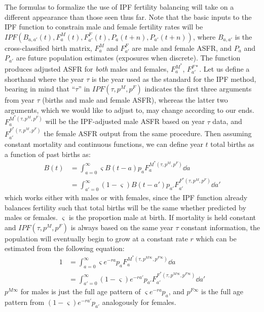The formulas to formalize the use of IPF fertility balancing will take on a
different appearance than those seen thus far. Note that the basic inputs to the
IPF function to constrain male and female fertility rates will be
$IPF(B_{a,a'}(t), F_a^M(t), F_{a'}^F(t),P_a(t+n),P_{a'}(t+n))$, where $B_{a,a'}$
is the cross-classified birth matrix, $F_a^M$ and $F_{a'}^F$ are male and female ASFR,
and $P_a$ and $P_{a'}$ are future population estimates (exposures when
discrete). The function produces adjusted ASFR for \textit{both} males and females,
$F_a^{M^\ast}$, $F_{a'}^{F\ast}$. Let us define a shorthand where the year
$\tau$ is the year used as the standard for the IPF method, bearing in mind that
``$\tau$'' in $IPF(\tau, p^M, p^F)$ indicates the first three arguments from
year $\tau$ (births and male and female ASFR), whereas the latter two arguments,
which we would like to adjust to, may change according to our ends. $F_a^{M^\ast(\tau,p^M, p^F)}$
will be the IPF-adjusted male ASFR based on year $\tau$ data, and
$F_{a'}^{F^\ast(\tau,p^M, p^F)}$ the female ASFR output from the same procedure.
Then assuming constant mortality and continuous functions, we can define year
$t$ total births as a function of past births as:
\begin{align}
B(t) &= \int_{a=0}^\infty \varsigma B(t-a)p_aF_a^{M^\ast(\tau,p^M, p^F)}\dd a
\\ &= \int_{a'=0}^\infty (1-\varsigma) B(t-a')p_{a'}F_{a'}^{F^\ast(\tau,p^M,
p^F)}\dd a'
\end{align}
which works either with males or with females, since the IPF function already
balances fertility such that total births will be the same whether predicted by
males or females. $\varsigma$ is the proportion male at birth. If mortality is
held constant and $IPF(\tau,p^M, p^F)$ is always based on the same year $\tau$ 
constant information, the population will eventually begin
to grow at a constant rate $r$ which can be estimated from the following
equation:
\begin{align}
\label{eq:IPFtricky}
1 &= \int_{a=0}^\infty \varsigma e^{-ra}p_aF_a^{M^\ast(\tau,p^{M\infty},
p^{F\infty})}\dd a \\ 
&= \int_{a'=0}^\infty (1-\varsigma) e^{-ra'}p_{a'}F_{a'}^{F^\ast(\tau,p^{M\infty},
p^{F\infty})}\dd a'
\end{align}
$p^{M\infty}$ for males is just the full age pattern of
$\varsigma e^{-ra}p_a$, and $p^{F\infty}$ is the full age pattern
from $(1-\varsigma) e^{-ra'}p_{a'}$ analogously for females. 


